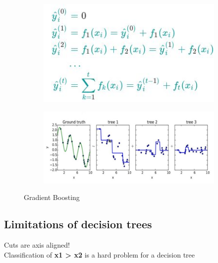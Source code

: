 \begin{figure}[ht]
	\centering
	\begin{subfigure}{.5\textwidth}
		\centering
		\includegraphics[width=1\linewidth]{figure_ml/g_b.png}
	\end{subfigure}%
	\begin{subfigure}{.5\textwidth}
		\centering
		\includegraphics[width=1\linewidth]{figure_ml/g_b2.png}
	\end{subfigure}
	\caption{Gradient Boosting}
\end{figure}



\subsection{Limitations of decision trees}
Cuts are axis aligned!\\
Classification of \textbf{x1 > x2} is a hard problem for a decision tree


